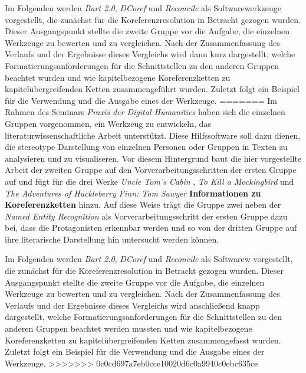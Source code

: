 \documentclass[a4paper,12pt,titlepage=true, ngerman]{scrartcl}
\begin{document}
Im Folgenden werden \emph{Bart 2.0}, \emph{DCoref} und \emph{Reconcile} als Softwarewerkzeuge vorgestellt, die zunächst für die Koreferenzresolution in Betracht gezogen wurden. Dieser Ausgangspunkt stellte die zweite Gruppe vor die Aufgabe, die einzelnen Werkzeuge zu bewerten und zu vergleichen. Nach der Zusammenfassung des Verlaufs und der Ergebnisse dieses Vergleichs wird dann kurz dargestellt, welche Formatierungsanforderungen für die Schnittstellen zu den anderen Gruppen beachtet wurden und wie kapitelbezogene Koreferenzketten zu kapitelübergreifenden Ketten zusammengeführt wurden. Zuletzt folgt ein Beispiel für die Verwendung und die Ausgabe eines der Werkzeuge.
=======
Im Rahmen des Seminars \emph{Praxis der Digital Humanities} haben sich die einzelnen Gruppen vorgenommen, 
ein Werkzeug zu entwickeln, das literaturwissenschaftliche Arbeit unterstützt. 
Diese Hilfssoftware soll dazu dienen, die stereotype Darstellung von einzelnen Personen oder Gruppen in Texten zu analysieren 
und zu visualiseren. 
Vor diesem Hintergrund baut die hier vorgestellte Arbeit der zweiten Gruppe auf den Vorverarbeitungsschritten der ersten Gruppe auf 
und fügt für die drei Werke \emph{Uncle Tom's Cabin}  \autocite[]{chris_uncle}, 
\emph{To Kill a Mockingbird}  \autocite[]{chris_bird} und 
\emph{The Adventures of Huckleberry Finn: Tom Sawyer} \autocite[]{chris_adventures} \textbf{Informationen zu Koreferenzketten} hinzu. 
Auf diese Weise trägt die Gruppe zwei neben der \emph{Named Entity Recognition} als Vorverarbeitungsschritt der ersten Gruppe dazu bei, 
dass die Protagonisten erkennbar werden und so von der dritten Gruppe auf ihre literarische Darstellung hin untersucht werden können.

Im Folgenden werden \emph{Bart 2.0}, \emph{DCoref} und \emph{Reconcile} als Softwarew vorgestellt, 
die zunächst für die Koreferenzresolution in Betracht gezogen wurden. 
Dieser Ausgangspunkt stellte die zweite Gruppe vor die Aufgabe, die einzelnen Werkzeuge zu bewerten und zu vergleichen. 
Nach der Zusammenfassung des Verlaufs und der Ergebnisse dieses Vergleichs wird anschließend knapp dargestellt, 
welche Formatierungsanforderungen für die Schnittstellen zu den anderen Gruppen beachtet werden mussten 
und wie kapitelbezogene Koreferenzketten zu kapitelübergreifenden Ketten zusammengefasst wurden. 
Zuletzt folgt ein Beispiel für die Verwendung und die Ausgabe eines der Werkzeuge.
>>>>>>> 0c0cd697a7eb0cce10020d6c0a9940c0ebc635ce


\end{document}
